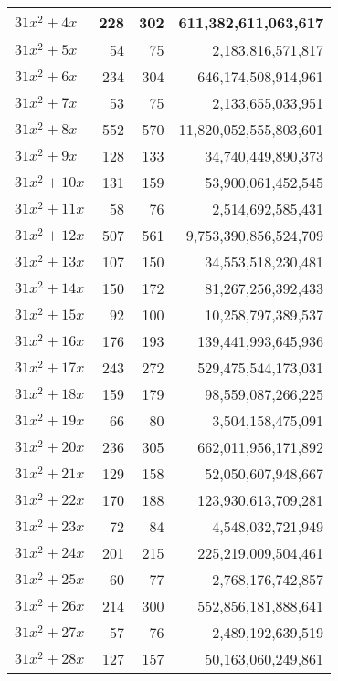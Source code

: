 \documentclass[a4paper]{amsproc}
\theoremstyle{plain}
\begin{document}
\begin{longtable}{ | l | r | r | r | }
$31x^2 + 4x$ & 228 & 302 & 611{,}382{,}611{,}063{,}617 \\ \hline
$31x^2 + 5x$ & 54 & 75 & 2{,}183{,}816{,}571{,}817 \\ \hline
$31x^2 + 6x$ & 234 & 304 & 646{,}174{,}508{,}914{,}961 \\ \hline
$31x^2 + 7x$ & 53 & 75 & 2{,}133{,}655{,}033{,}951 \\ \hline
$31x^2 + 8x$ & 552 & 570 & 11{,}820{,}052{,}555{,}803{,}601 \\ \hline
$31x^2 + 9x$ & 128 & 133 & 34{,}740{,}449{,}890{,}373 \\ \hline
$31x^2 + 10x$ & 131 & 159 & 53{,}900{,}061{,}452{,}545 \\ \hline
$31x^2 + 11x$ & 58 & 76 & 2{,}514{,}692{,}585{,}431 \\ \hline
$31x^2 + 12x$ & 507 & 561 & 9{,}753{,}390{,}856{,}524{,}709 \\ \hline
$31x^2 + 13x$ & 107 & 150 & 34{,}553{,}518{,}230{,}481 \\ \hline
$31x^2 + 14x$ & 150 & 172 & 81{,}267{,}256{,}392{,}433 \\ \hline
$31x^2 + 15x$ & 92 & 100 & 10{,}258{,}797{,}389{,}537 \\ \hline
$31x^2 + 16x$ & 176 & 193 & 139{,}441{,}993{,}645{,}936 \\ \hline
$31x^2 + 17x$ & 243 & 272 & 529{,}475{,}544{,}173{,}031 \\ \hline
$31x^2 + 18x$ & 159 & 179 & 98{,}559{,}087{,}266{,}225 \\ \hline
$31x^2 + 19x$ & 66 & 80 & 3{,}504{,}158{,}475{,}091 \\ \hline
$31x^2 + 20x$ & 236 & 305 & 662{,}011{,}956{,}171{,}892 \\ \hline
$31x^2 + 21x$ & 129 & 158 & 52{,}050{,}607{,}948{,}667 \\ \hline
$31x^2 + 22x$ & 170 & 188 & 123{,}930{,}613{,}709{,}281 \\ \hline
$31x^2 + 23x$ & 72 & 84 & 4{,}548{,}032{,}721{,}949 \\ \hline
$31x^2 + 24x$ & 201 & 215 & 225{,}219{,}009{,}504{,}461 \\ \hline
$31x^2 + 25x$ & 60 & 77 & 2{,}768{,}176{,}742{,}857 \\ \hline
$31x^2 + 26x$ & 214 & 300 & 552{,}856{,}181{,}888{,}641 \\ \hline
$31x^2 + 27x$ & 57 & 76 & 2{,}489{,}192{,}639{,}519 \\ \hline
$31x^2 + 28x$ & 127 & 157 & 50{,}163{,}060{,}249{,}861 \\ \hline

\end{longtable}
\end{document}
